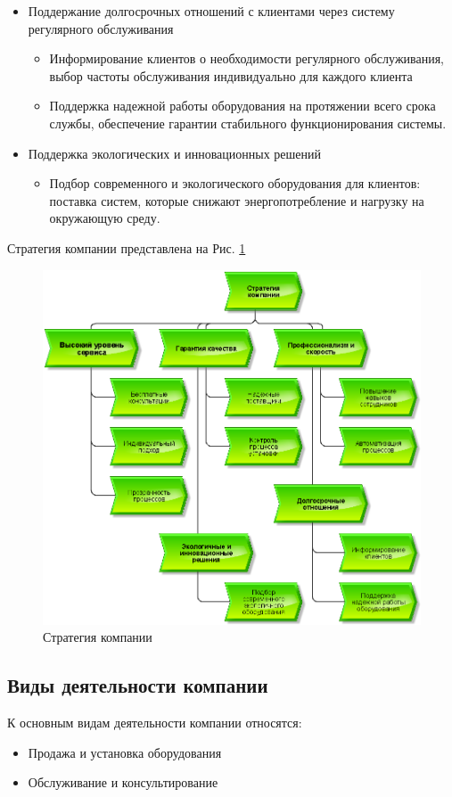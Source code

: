 \documentclass[a4paper,12pt]{article}
\begin{document}
\begin{itemize}
\begin{itemize}
    \end{itemize}
    \item Поддержание долгосрочных отношений с клиентами через систему регулярного обслуживания
    \begin{itemize}
        \item Информирование клиентов о необходимости регулярного обслуживания, выбор частоты обслуживания индивидуально для каждого клиента
        \item Поддержка надежной работы оборудования на протяжении всего срока службы, обеспечение гарантии стабильного функционирования системы.
    \end{itemize}
    \item Поддержка экологических и инновационных решений
    \begin{itemize}
        \item Подбор современного и экологического оборудования для клиентов: поставка систем, которые снижают энергопотребление и нагрузку на окружающую среду.
    \end{itemize}
\end{itemize}

Стратегия компании представлена на Рис. \ref{fig:company_strategy}

\begin{figure}[H]
    \centering
    \includegraphics[width=0.8\linewidth]{company_strategy.png}
    \caption{Стратегия компании}
    \label{fig:company_strategy}
\end{figure}

\subsection{Виды деятельности компании}
К основным видам деятельности компании относятся:
\begin{itemize}
    \item Продажа и установка оборудования
    \item Обслуживание и консультирование
\end{itemize}
\end{document}
